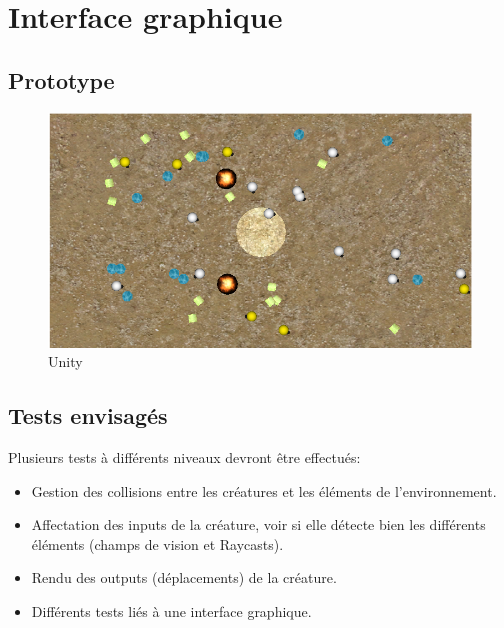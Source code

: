 \section{Interface graphique}
\subsection{Prototype}
\begin{figure}[H]
    \centering
    \includegraphics[width=1\textwidth]{./pictures/unity.png}
    \caption{Unity}
\end{figure}

\subsection{Tests envisagés}
Plusieurs tests à différents niveaux devront être effectués:
\begin{itemize}
  \item Gestion des collisions entre les créatures et les éléments de l'environnement.
 \item Affectation des inputs de la créature, voir si elle détecte bien les différents éléments (champs de vision et Raycasts).
 \item Rendu des outputs (déplacements) de la créature.
 \item Différents tests liés à une interface graphique.
\end{itemize}
\clearpage
